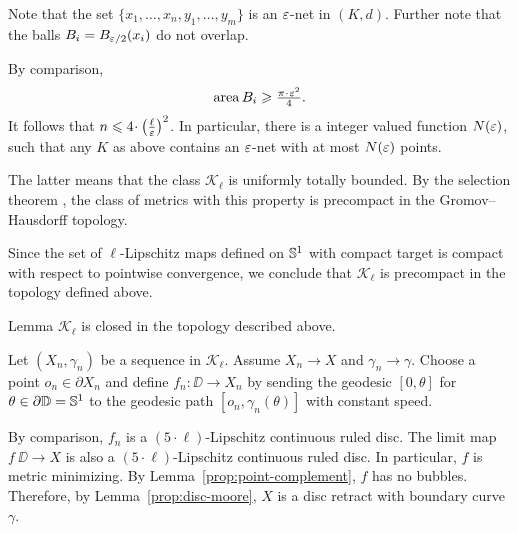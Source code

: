 Note that the set $\{x_1,\dots,x_n,y_1,\dots,y_m\}$
is an $\varepsilon$-net in $(K,d)$.
Further note that the balls $B_i=B_{\varepsilon/2}(x_i)$
do not overlap.

By comparison,
\[\area B_i\ge \tfrac{\pi\cdot\eps^2}{4}.\]
It follows that $n\le 4\cdot\left(\tfrac\ell\eps\right)^2$.
In particular, there is a integer valued function $N(\varepsilon)$, such that any  
$K$ as above contains an $\varepsilon$-net
with at most $N(\varepsilon)$ points.

The latter means that the class $\mathcal{K}_\ell$ is uniformly totally bounded.
By the selection theorem \cite[7.4.15]{BBI}, the class of metrics with this property is precompact in the Gromov--Hausdorff topology.

Since the set of $\ell$-Lipschitz maps defined on $\mathbb{S}^1$ with compact target is compact 
with respect to pointwise convergence, we conclude that $\mathcal{K}_\ell$ is precompact in the topology defined above. 
\qeds





\begin{thm}{Lemma}\label{lem:closed}
$\mathcal{K}_\ell$ is closed in the topology described above.
\end{thm}

Let $(X_n,\gamma_n)$ be a sequence in $\mathcal{K}_\ell$.
Assume $X_n\to X$ and $\gamma_n\to\gamma$. 
Choose a point $o_n\in \partial X_n$ and define
$f_n:\DD\to X_n$ by sending the geodesic $[0,\theta]$ for $\theta\in\partial \mathbb{D}=\mathbb{S}^1$ to the geodesic path $[o_n,\gamma_n(\theta)]$ with constant speed. 

By comparison, $f_n$ is a $(5\cdot\ell)$-Lipschitz continuous ruled disc. %
The limit map $f\:\DD\to X$ is also a $(5\cdot\ell)$-Lipschitz continuous ruled disc. In particular, $f$
is metric minimizing. By Lemma~\ref{prop:point-complement}, $f$ has no bubbles.
Therefore, by Lemma~\ref{prop:disc-moore}, $X$ is a disc retract with boundary curve $\gamma$.
\qeds
